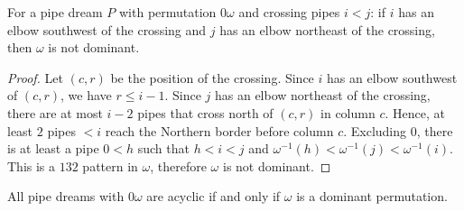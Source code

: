 \begin{lemma}\label{lem:not_dominant}
For a pipe dream $P$ with permutation $0\omega$ and crossing pipes $i<j$: if $i$ has an elbow southwest of the crossing and $j$ has an elbow northeast of the crossing, then $\omega$ is not dominant.
\end{lemma}

\begin{proof}
Let $(c,r)$ be the position of the crossing. Since $i$ has an elbow southwest of $(c,r)$, we have $r\leq i-1$.
Since $j$ has an elbow northeast of the crossing, there are at most $i-2$ pipes that cross north of $(c,r)$ in column $c$.
Hence, at least $2$ pipes $<i$ reach the Northern border before column $c$.
Excluding $0$, there is at least a pipe $0<h$ such that $h<i<j$ and $\omega^{-1}(h)< \omega^{-1}(j)<\omega^{-1}(i)$.
This is a $132$ pattern in $\omega$, therefore $\omega$ is not dominant.
\end{proof}

\begin{theorem}
\label{prob:nuAcyclicProperty}
All pipe dreams with $0 \omega$ are acyclic if and only if $\omega$ is a dominant permutation.
\end{theorem}

